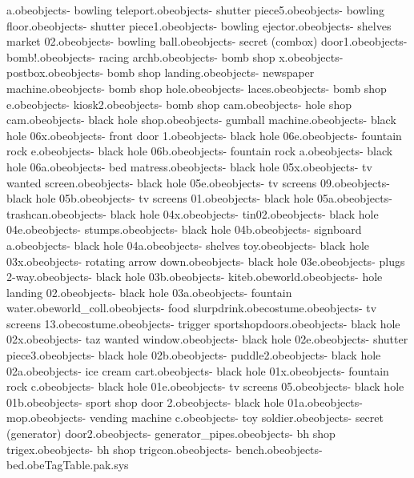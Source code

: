a.obe objects\bank - bowling teleport.obe objects\bank - shutter piece5.obe objects\bank - bowling floor.obe objects\bank - shutter piece1.obe objects\bank - bowling ejector.obe objects\bank - shelves market 02.obe objects\bank - bowling ball.obe objects\bank - secret (combox) door1.obe objects\bank - bomb!.obe objects\bank - racing archb.obe objects\bank - bomb shop x.obe objects\bank - postbox.obe objects\bank - bomb shop landing.obe objects\bank - newspaper machine.obe objects\bank - bomb shop hole.obe objects\bank - laces.obe objects\bank - bomb shop e.obe objects\bank - kiosk2.obe objects\bank - bomb shop cam.obe objects\bank - hole shop cam.obe objects\bank - black hole shop.obe objects\bank - gumball machine.obe objects\bank - black hole 06x.obe objects\bank - front door 1.obe objects\bank - black hole 06e.obe objects\bank - fountain rock e.obe objects\bank - black hole 06b.obe objects\bank - fountain rock a.obe objects\bank - black hole 06a.obe objects\bank - bed matress.obe objects\bank - black hole 05x.obe objects\bank - tv wanted screen.obe objects\bank - black hole 05e.obe objects\bank - tv screens 09.obe objects\bank - black hole 05b.obe objects\bank - tv screens 01.obe objects\bank - black hole 05a.obe objects\bank - trashcan.obe objects\bank - black hole 04x.obe objects\bank - tin02.obe objects\bank - black hole 04e.obe objects\bank - stumps.obe objects\bank - black hole 04b.obe objects\bank - signboard a.obe objects\bank - black hole 04a.obe objects\bank - shelves toy.obe objects\bank - black hole 03x.obe objects\bank - rotating arrow down.obe objects\bank - black hole 03e.obe objects\bank - plugs 2-way.obe objects\bank - black hole 03b.obe objects\bank - kiteb.obe world.obe objects\bank - hole landing 02.obe objects\bank - black hole 03a.obe objects\bank - fountain water.obe world_coll.obe objects\bank - food slurpdrink.obe costume\tazrappa.obe objects\bank - tv screens 13.obe costume\baseballcap.obe objects\bank - trigger sportshopdoors.obe objects\bank - black hole 02x.obe objects\bank - taz wanted window.obe objects\bank - black hole 02e.obe objects\bank - shutter piece3.obe objects\bank - black hole 02b.obe objects\bank - puddle2.obe objects\bank - black hole 02a.obe objects\bank - ice cream cart.obe objects\bank - black hole 01x.obe objects\bank - fountain rock c.obe objects\bank - black hole 01e.obe objects\bank - tv screens 05.obe objects\bank - black hole 01b.obe objects\bank - sport shop door 2.obe objects\bank - black hole 01a.obe objects\bank - mop.obe objects\bank - vending machine c.obe objects\bank - toy soldier.obe objects\bank - secret (generator) door2.obe objects\bank - generator_pipes.obe objects\bank - bh shop trigex.obe objects\bank - bh shop trigcon.obe objects\bank - bench.obe objects\bank - bed.obe TagTable.pak.sys 